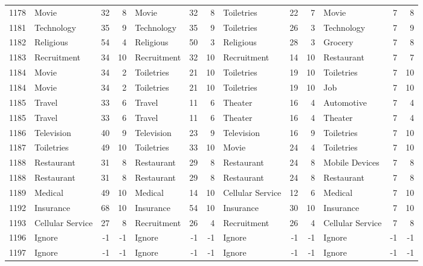 \begin{figure}[htbp]
\begin{tabular}{rlrrlrrlrrlrr}
    1178  & Movie & 32    & 8     & Movie & 32    & 8     & Toiletries & 22    & 7     & Movie & 7     & 8 \\
    1181  & Technology & 35    & 9     & Technology & 35    & 9     & Toiletries & 26    & 3     & Technology & 7     & 9 \\
    1182  & Religious & 54    & 4     & Religious & 50    & 3     & Religious & 28    & 3     & Grocery & 7     & 8 \\
    1183  & Recruitment & 34    & 10    & Recruitment & 32    & 10    & Recruitment & 14    & 10    & Restaurant & 7     & 7 \\
    1184  & Movie & 34    & 2     & Toiletries & 21    & 10    & Toiletries & 19    & 10    & Toiletries & 7     & 10 \\
    1184  & Movie & 34    & 2     & Toiletries & 21    & 10    & Toiletries & 19    & 10    & Job   & 7     & 10 \\
    1185  & Travel & 33    & 6     & Travel & 11    & 6     & Theater & 16    & 4     & Automotive & 7     & 4 \\
    1185  & Travel & 33    & 6     & Travel & 11    & 6     & Theater & 16    & 4     & Theater & 7     & 4 \\
    1186  & Television & 40    & 9     & Television & 23    & 9     & Television & 16    & 9     & Toiletries & 7     & 10 \\
    1187  & Toiletries & 49    & 10    & Toiletries & 33    & 10    & Movie & 24    & 4     & Toiletries & 7     & 10 \\
    1188  & Restaurant & 31    & 8     & Restaurant & 29    & 8     & Restaurant & 24    & 8     & Mobile Devices & 7     & 8 \\
    1188  & Restaurant & 31    & 8     & Restaurant & 29    & 8     & Restaurant & 24    & 8     & Restaurant & 7     & 8 \\
    1189  & Medical & 49    & 10    & Medical & 14    & 10    & Cellular Service & 12    & 6     & Medical & 7     & 10 \\
    1192  & Insurance & 68    & 10    & Insurance & 54    & 10    & Insurance & 30    & 10    & Insurance & 7     & 10 \\
    1193  & Cellular Service & 27    & 8     & Recruitment & 26    & 4     & Recruitment & 26    & 4     & Cellular Service & 7     & 8 \\
    1196  & Ignore & -1    & -1    & Ignore & -1    & -1    & Ignore & -1    & -1    & Ignore & -1    & -1 \\
    1197  & Ignore & -1    & -1    & Ignore & -1    & -1    & Ignore & -1    & -1    & Ignore & -1    & -1 \\

\end{tabular}
\end{figure}
